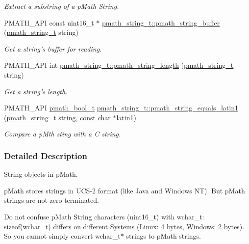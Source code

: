 \begin{CompactItemize}
\begin{CompactList}\small\item\em Extract a substring of a pMath String. \item\end{CompactList}\item 
PMATH\_\-API const uint16\_\-t $\ast$ \hyperlink{group__strings_g381c6abdb25ce421c93c72aa51f33c29}{pmath\_\-string\_\-t::pmath\_\-string\_\-buffer} (\hyperlink{classpmath__string__t}{pmath\_\-string\_\-t} string)
\begin{CompactList}\small\item\em Get a string's buffer for reading. \item\end{CompactList}\item 
PMATH\_\-API int \hyperlink{group__strings_g4f5ac7eaecd0c7e9916794145938874d}{pmath\_\-string\_\-t::pmath\_\-string\_\-length} (\hyperlink{classpmath__string__t}{pmath\_\-string\_\-t} string)
\begin{CompactList}\small\item\em Get a string's length. \item\end{CompactList}\item 
PMATH\_\-API \hyperlink{group__general__types_gc92090cb0b56345d6c379ed2341d4ef4}{pmath\_\-bool\_\-t} \hyperlink{group__strings_g710d7a70319d6fa805ddd7ed0ea65365}{pmath\_\-string\_\-t::pmath\_\-string\_\-equals\_\-latin1} (\hyperlink{classpmath__string__t}{pmath\_\-string\_\-t} string, const char $\ast$latin1)
\begin{CompactList}\small\item\em Compare a pMth sting with a C string. \item\end{CompactList}\end{CompactItemize}


\subsubsection{Detailed Description}
String objects in pMath. 

pMath stores strings in UCS-2 format (like Java and Windows NT). But pMath strings are not zero terminated.

Do not confuse pMath String characters (uint16\_\-t) with wchar\_\-t: sizeof(wchar\_\-t) differs on different Systems (Linux: 4 bytes, Windows: 2 bytes). So you cannot simply convert wchar\_\-t$\ast$ strings to pMath strings. 

